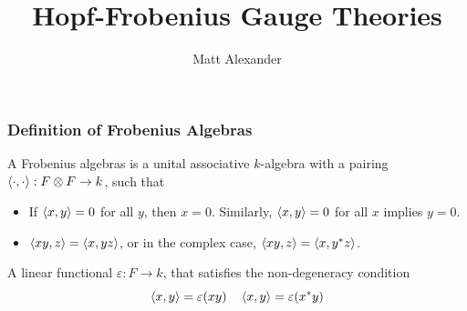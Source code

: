 \documentclass{beamer}
\title{Hopf-Frobenius Gauge Theories}
\author{Matt Alexander}
\begin{document}
\begin{frame}
\titlepage
\end{frame}













\begin{frame}

\frametitle{Definition of Frobenius Algebras}


A Frobenius algebras is a unital associative $k$-algebra with a pairing $\left\langle \cdot, \cdot \right\rangle: F \otimes F \to k$, such that

\begin{itemize}
\item {} If $\left\langle x,y \right\rangle = 0$ for all $y$, then $x = 0$. Similarly, $\left\langle x,y \right\rangle = 0$ for all $x$ implies $y=0$.

\item {} $\left\langle xy,z \right\rangle = \left\langle x,yz \right\rangle$, or in the complex case, $\left\langle xy,z \right\rangle = \left\langle x, y^* z \right\rangle$.
\end{itemize}


 A linear functional $\varepsilon: F \to k$, that satisfies the non-degeneracy condition
\begin{equation*}
\left\langle x,y \right\rangle = \varepsilon(xy) \quad \left\langle x,y \right\rangle = \varepsilon(x^* y)
\end{equation*}


\end{frame}





\end{document}
